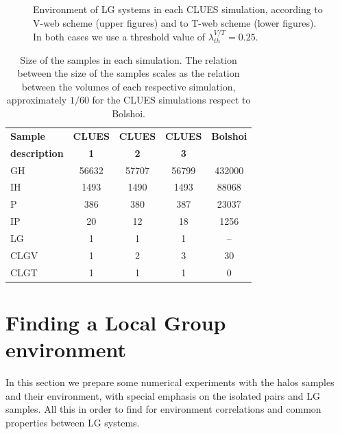 \documentclass[usenatbib]{latex/mn2e}
\begin{document}
\begin{figure}
\begin{center}
\caption{\small Environment of LG systems in each CLUES simulation, 
according to V-web scheme (upper figures) and to T-web scheme (lower 
figures). In both cases we use a threshold value of $\lambda_{th}^{V/T} = 
0.25$.}
\label{fig:LG_CLUES_Environment}
\vspace{0.1 cm}
\end{center}
\end{figure}

\begin{table}
  \centering
  \begin{tabular}{l | c c c c} \hline
	\textbf{Sample}& \textbf{CLUES} & \textbf{CLUES} & \textbf{CLUES} & \textbf{Bolshoi} \\
	\textbf{description}& \textbf{1} & \textbf{2} & \textbf{3} &  \\ \hline
	GH	&	56632	&	57707	&	56799	&	432000 	\\
	IH	&	1493	&	1490	&	1493	&	88068 	\\
	P	&	386 	&	380 	&	387		&	23037 	\\
	IP	&	20	 	&	12		&	18		&	1256 	\\
	LG	&	1 		&	1 		&	1		&	-- 		\\
	CLGV &	1		&	2		&	3		&	30		\\
	CLGT &	1		&	1		&	1		&	0		\\ \hline
  \end{tabular}
  
  \caption{Size of the samples in each simulation. The relation between 
  the size of the samples scales as the relation between the volumes of 
  each respective simulation, approximately $1/60$ for the CLUES 
  simulations respect to Bolshoi.}
  
  \label{Tab:Samples_Size}
\end{table}


\section{Finding a Local Group environment}
\label{sec:experiments}



In this section we prepare some numerical experiments with the halos 
samples and their environment, with special emphasis on the isolated pairs 
and LG samples. All this in order to find for environment correlations and 
common properties between LG systems.
\end{document}
